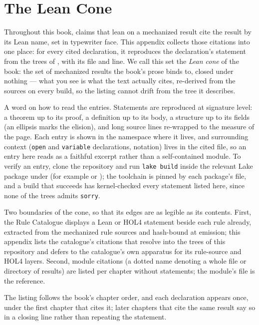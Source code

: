 \chapter{The Lean Cone}
\label{app:lean-cone}


Throughout this book, claims that lean on a mechanized result cite
the result by its Lean name, set in typewriter face. This appendix
collects those citations into one place: for every cited declaration,
it reproduces the declaration's statement from the 
trees of , with its file and line. We call this set the \emph{Lean cone} of the book: the set
of mechanized results the book's prose binds to, closed under
nothing --- what you see is what the text actually cites, re-derived
from the sources on every build, so the listing cannot drift from
the tree it describes.

A word on how to read the entries. Statements are reproduced at
signature level: a theorem up to its proof, a definition up to its
body, a structure up to its fields (an ellipsis marks the elision),
and long source lines re-wrapped to the measure of the page.
Each entry is shown in the namespace where it lives, and surrounding
context (\texttt{open} and \texttt{variable} declarations,
notation) lives in the cited file, so an entry here reads as a
faithful excerpt rather than a self-contained module. To verify an
entry, clone the repository and run \texttt{lake build} inside the
relevant Lake package under  (for example
 or ); the toolchain is pinned
by each package's  file, and a build that
succeeds has kernel-checked every statement listed here, since none
of the trees admits \texttt{sorry}.

Two boundaries of the cone, so that its edges are as legible as its
contents. First, the Rule Catalogue displays a Lean or HOL4
statement beside each rule already, extracted from the mechanized
rule sources and hash-bound at emission; this appendix lists the
catalogue's citations that resolve into the  trees of
this repository and defers to the catalogue's own apparatus for its
rule-source and HOL4 layers. Second, module citations (a dotted
name denoting a whole file or directory of results) are listed per
chapter without statements; the module's file is the reference.

The listing follows the book's chapter order, and each declaration
appears once, under the first chapter that cites it; later chapters
that cite the same result say so in a closing line rather than
repeating the statement.


